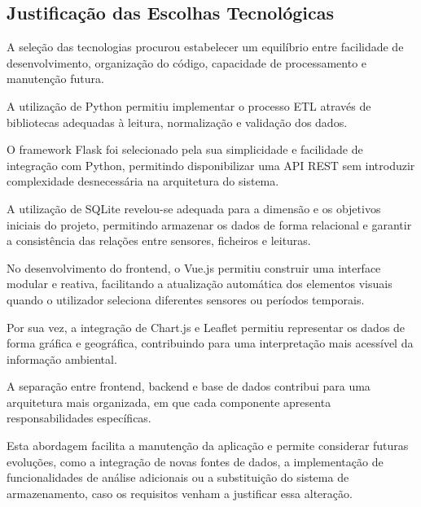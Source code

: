 \subsection{Justificação das Escolhas Tecnológicas}
\label{subsec:justificacao}

A seleção das tecnologias procurou
estabelecer um equilíbrio entre
facilidade de desenvolvimento,
organização do código, capacidade
de processamento e manutenção futura.

A utilização de Python permitiu
implementar o processo ETL através
de bibliotecas adequadas à leitura,
normalização e validação dos dados.

O framework Flask foi selecionado
pela sua simplicidade e facilidade
de integração com Python, permitindo
disponibilizar uma API REST sem
introduzir complexidade desnecessária
na arquitetura do sistema.

A utilização de SQLite revelou-se
adequada para a dimensão e os
objetivos iniciais do projeto,
permitindo armazenar os dados
de forma relacional e garantir
a consistência das relações
entre sensores, ficheiros e leituras.

No desenvolvimento do frontend,
o Vue.js permitiu construir uma
interface modular e reativa,
facilitando a atualização automática
dos elementos visuais quando
o utilizador seleciona diferentes
sensores ou períodos temporais.

Por sua vez, a integração de
Chart.js e Leaflet permitiu
representar os dados de forma
gráfica e geográfica, contribuindo
para uma interpretação mais
acessível da informação ambiental.

A separação entre frontend,
backend e base de dados contribui
para uma arquitetura mais organizada,
em que cada componente apresenta
responsabilidades específicas.

Esta abordagem facilita a manutenção
da aplicação e permite considerar
futuras evoluções, como a integração
de novas fontes de dados,
a implementação de funcionalidades
de análise adicionais ou a
substituição do sistema de
armazenamento, caso os requisitos
venham a justificar essa alteração.
